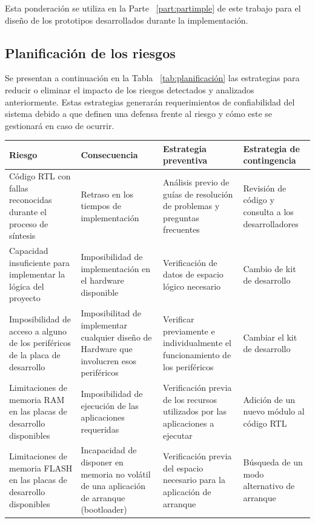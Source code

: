 	    Esta ponderación se utiliza en la Parte ~\ref{part:partimple} de este trabajo para el diseño de los prototipos desarrollados durante la
	    implementación.
	    
		\newpage
		\subsection{Planificación de los riesgos}	

Se presentan a continuación en la Tabla ~\ref {tab:planificación} las estrategias para reducir o eliminar el impacto de los riesgos detectados y analizados anteriormente. Estas estrategias generarán requerimientos de confiabilidad del sistema debido a que definen una defensa frente al riesgo y cómo este se gestionará en caso de ocurrir.
	
        \begin{table}[!h]
		\centering
		\begin{tabular}{ p{4cm} p{4cm} p{4cm} p{3cm} }
		\hline 
		\rowcolor[gray]{0.8} Riesgo & Consecuencia & Estrategia preventiva & Estrategia de contingencia\\
		\hline
		Código RTL con fallas reconocidas durante el proceso de síntesis& Retraso en los tiempos de implementación & Análisis previo de guías de resolución de problemas y preguntas frecuentes & Revisión de código y consulta a los desarrolladores \\
		\hline
		 Capacidad insuficiente para implementar la lógica del proyecto & Imposibilidad de implementación en el hardware disponible  & Verificación de datos de espacio lógico necesario  & Cambio de kit de desarrollo\\	 
		\hline
		 Imposibilidad de acceso a alguno de los periféricos de la placa de desarrollo & Imposibilitad de implementar cualquier diseño de Hardware que involucren esos periféricos& Verificar previamente e individualmente el funcionamiento de los periféricos & Cambiar el kit de desarrollo\\
		\hline
		Limitaciones de memoria RAM en las placas de desarrollo disponibles& Imposibilidad de ejecución de las aplicaciones requeridas & Verificación previa de los recursos utilizados por las aplicaciones a ejecutar & Adición de un nuevo módulo al código RTL  \\	 
		\hline
		Limitaciones de memoria FLASH en las placas de desarrollo disponibles& Incapacidad de disponer en memoria no volátil de una aplicación de arranque (bootloader) & Verificación previa del espacio necesario para la aplicación de arranque & Búsqueda de un modo alternativo de arranque\\ 

\end{tabular}
\end{table}
